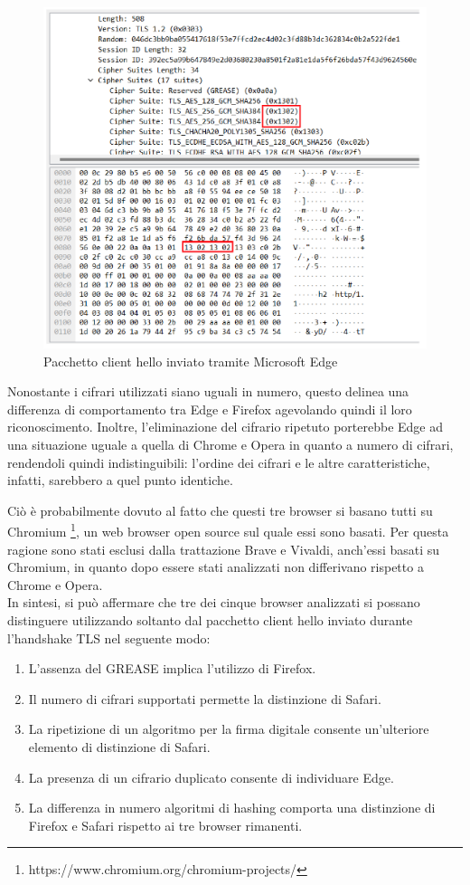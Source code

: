 \begin{figure}[H]
	\centering
	\includegraphics[width=\textwidth]{figures/cifrario_ripetuto.png}
	\caption{Pacchetto client hello inviato tramite Microsoft Edge}
	\label{cifrario_ripetuto}
\end{figure}

Nonostante i cifrari utilizzati siano uguali in numero, questo delinea una differenza di comportamento tra Edge e Firefox agevolando quindi il loro riconoscimento. Inoltre, l'eliminazione del cifrario ripetuto porterebbe Edge ad una situazione uguale a quella di Chrome e Opera in quanto a numero di cifrari, rendendoli quindi indistinguibili: l'ordine dei cifrari e le altre caratteristiche, infatti, sarebbero a quel punto identiche.

Ciò è probabilmente dovuto al fatto che questi tre browser si basano tutti su Chromium \footnote{https://www.chromium.org/chromium-projects/}, un web browser open source sul quale essi sono basati. Per questa ragione sono stati esclusi dalla trattazione Brave e Vivaldi, anch'essi basati su Chromium, in quanto dopo essere stati analizzati non differivano rispetto a Chrome e Opera.
\\
In sintesi, si può affermare che tre dei cinque browser analizzati si possano distinguere utilizzando soltanto dal pacchetto client hello inviato durante l'handshake TLS nel seguente modo:
\begin{enumerate}
	\item L'assenza del GREASE implica l'utilizzo di Firefox.
	\item Il numero di cifrari supportati permette la distinzione di Safari.
	\item La ripetizione di un algoritmo per la firma digitale consente un'ulteriore elemento di distinzione di Safari.
	\item La presenza di un cifrario duplicato consente di individuare Edge.
	\item La differenza in numero algoritmi di hashing comporta una distinzione di Firefox e Safari rispetto ai tre browser rimanenti.
\end{enumerate}


 








